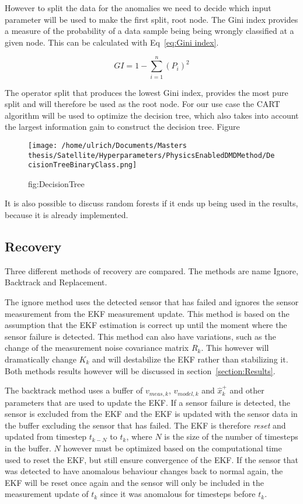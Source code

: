 \documentclass[letterpaper, 10 pt, conference]{ieeeconf}  %
\begin{document}
However to split the data for the anomalies we need to decide which input parameter will be used to make the first split, root node. The Gini index provides a measure of the probability of a data sample being being wrongly classified at a given node. This can be calculated with Eq~\ref{eq:Gini index}.

\begin{equation}
GI = 1 - \sum_{i = 1}^{n}{(P_i)^2}
\label{eq:Gini index}
\end{equation}

The operator split that produces the lowest Gini index, provides the most pure split and will therefore be used as the root node. For our use case the CART algorithm will be used to optimize the decision tree, which also takes into account the largest information gain to construct the decision tree. Figure

\begin{figure*}[!htb]
	\centering
	\texttt{[image: /home/ulrich/Documents/Masters thesis/Satellite/Hyperparameters/PhysicsEnabledDMDMethod/DecisionTreeBinaryClass.png]}
	\caption{fig:DecisionTree}
\end{figure*}

It is also possible to discuss random forests if it ends up being used in the results, because it is already implemented.


\subsection{Recovery}
Three different methods of recovery are compared. The methods are name Ignore, Backtrack and Replacement. 

The ignore method uses the detected sensor that has failed and ignores the sensor measurement from the EKF measurement update. This method is based on the assumption that the EKF estimation is correct up until the moment where the sensor failure is detected. This method can also have variations, such as the change of the measurement noise covariance matrix $R_k$. This however will dramatically change $K_k$ and will destabilize the EKF rather than stabilizing it. Both methods results however will be discussed in section~\ref{section:Results}.

The backtrack method uses a buffer of $v_{meas,k}$, $v_{model,k}$ and $\hat{x}_k^+$ and other parameters that are used to update the EKF. If a sensor failure is detected, the sensor is excluded from the EKF and the EKF is updated with the sensor data in the buffer excluding the sensor that has failed. The EKF is therefore \emph{reset} and updated from timestep $t_{k-N}$ to $t_k$, where $N$ is the size of the number of timesteps in the buffer. $N$ however must be optimized based on the computational time used to reset the EKF, but still ensure convergence of the EKF. If the sensor that was detected to have anomalous behaviour changes back to normal again, the EKF will be reset once again and the sensor will only be included in the measurement update of $t_k$ since it was anomalous for timesteps before $t_k$.
\end{document}

